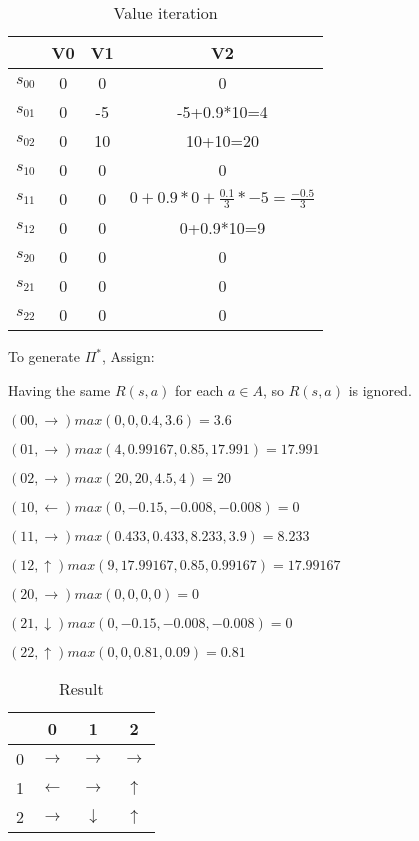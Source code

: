 \documentclass[12pt]{amsart}
\begin{document}
\begin{table}[!hbp]
\begin{tabular}{|c|c|c|c|}
\hline
\hline
 & V0 & V1 & V2  \\
\hline
$s_{00}$ & 0 & 0 & 0  \\
\hline
$s_{01}$ & 0 & -5 & -5+0.9*10=4  \\
\hline
$s_{02}$ & 0 & 10 & 10+10=20  \\
\hline
$s_{10}$ & 0 & 0 & 0 \\
\hline
$s_{11}$ & 0 & 0 & $0+0.9*0+\frac{0.1}{3}*-5=\frac{-0.5}{3}$\\
\hline
$s_{12}$ & 0 & 0 & 0+0.9*10=9  \\
\hline
$s_{20}$ & 0 & 0 & 0  \\
\hline
$s_{21}$ & 0 & 0 & 0  \\
\hline
$s_{22}$ & 0 & 0 & 0 \\
\hline
\end{tabular}
\caption{Value iteration}
\end{table} 

To generate $\Pi^{*}$,  Assign:

Having the same $R(s,a)$ for each $a \in A$, so $R(s,a)$ is ignored.

$(00,\rightarrow) max(0,0,0.4,3.6)=3.6$

$(01,\rightarrow) max(4,0.99167,0.85,17.991)=17.991$

$(02,\rightarrow) max(20,20,4.5,4)=20$ 

$(10,\leftarrow) max(0,-0.15,-0.008,-0.008)=0$

$(11,\rightarrow) max(0.433,0.433,8.233,3.9)=8.233$

$(12,\uparrow) max(9,17.99167,0.85,0.99167)=17.99167$

$(20,\rightarrow) max(0,0,0,0)=0$

$(21,\downarrow) max(0,-0.15,-0.008,-0.008)=0$

$(22,\uparrow) max(0,0,0.81,0.09)=0.81$

\begin{table}[!hbp]
\begin{tabular}{|c|c|c|c|}
\hline
\hline
 & 0 & 1 & 2  \\
\hline
0 & $\rightarrow$ & $ \rightarrow$ & $\rightarrow$  \\
\hline
1 & $\leftarrow$ & $\rightarrow$ & $\uparrow$  \\
\hline
2 & $\rightarrow$ & $\downarrow$ & $\uparrow$  \\
\hline
\end{tabular}
\caption{Result}
\end{table} 
\end{document}
